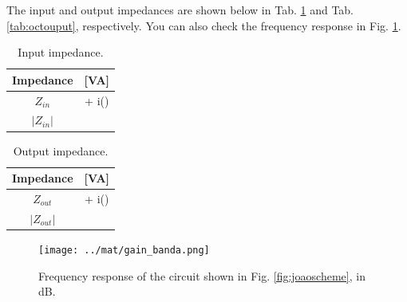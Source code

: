 The input and output impedances are shown below in Tab. \ref{tab:octinput} and Tab. \ref{tab:octouput}, respectively. You can also check the frequency response in Fig. \ref{fig:octavefreq}.

\begin{table}[H]
    \centering
    \begin{tabular}{|c|c|}
    	\hline
        Impedance &  [VA]\\ 
        \hline
        $Z_{in}$ &  + i()\\ \hline
        $|Z_{in}|$ & \\ \hline
    \end{tabular}
    \caption{Input impedance.}
    \label{tab:octinput}
\end{table}

\begin{table}[H]
    \centering
    \begin{tabular}{|c|c|}
    	\hline
        Impedance &  [VA]\\ 
        \hline
        $Z_{out}$ &  + i()\\ \hline
        $|Z_{out}|$ & \\ \hline
    \end{tabular}
    \caption{Output impedance.}
    \label{tab:octoutput}
\end{table}

\begin{figure}[H]
    \centering
    \texttt{[image: ../mat/gain\_banda.png]}
    \caption{Frequency response of the circuit shown in Fig. \ref{fig:joaoscheme}, in dB.}
    \label{fig:octavefreq}
\end{figure}